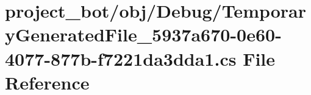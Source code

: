\hypertarget{project__bot_2obj_2_debug_2_temporary_generated_file__5937a670-0e60-4077-877b-f7221da3dda1_8cs}{}\section{project\+\_\+bot/obj/\+Debug/\+Temporary\+Generated\+File\+\_\+5937a670-\/0e60-\/4077-\/877b-\/f7221da3dda1.cs File Reference}
\label{project__bot_2obj_2_debug_2_temporary_generated_file__5937a670-0e60-4077-877b-f7221da3dda1_8cs}
